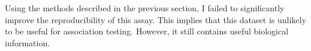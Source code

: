 %
Using the methods described in the previous section, I failed to significantly improve the reproducibility of this assay.
This implies that this dataset is unlikely to be useful for association testing.
However, it still contains useful biological information.

